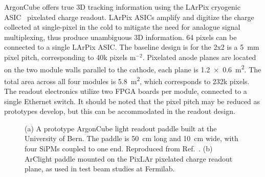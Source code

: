 ArgonCube offers true 3D tracking information using the LArPix cryogenic ASIC~\cite{larpix} pixelated charge readout. LArPix ASICs amplify and digitize the charge collected at single-pixel in the cold to mitigate the need for analogue signal multiplexing, thus produce unambiguous 3D information. 64 pixels can be connected to a single LArPix ASIC. The baseline design is for the 2x2 is a \SI{5}{\milli\metre} pixel pitch, corresponding to 40k pixels m$^{-2}$. Pixelated anode planes are located on the two module walls parallel to the cathode, each plane is \SI[product-units=repeat]{1.2x0.6}{\metre\squared}. The total area across all four modules is \SI{5.8}{\metre\squared}, which corresponds to 232k pixels. The readout electronics utilize two FPGA boards per module, connected to a single Ethernet switch. It should be noted that the pixel pitch may be reduced as prototypes develop, but this can be accommodated in the readout design. 

\begin{figure}[!ht]
	\centering
	\caption{(a) A prototype ArgonCube light readout paddle built at the University of Bern. The paddle is 50~cm long and 10~cm wide, with four SiPMs coupled to one end. Reproduced from Ref.~\cite{argoncube_loi}. (b) ArClight paddle mounted on the PixLAr pixelated charge readout plane, as used in test beam studies at Fermilab.}
	\label{fig:arclight}
\end{figure}

